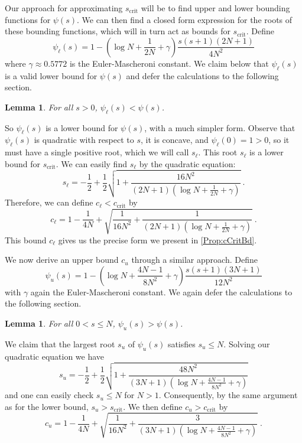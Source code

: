 \documentclass[11pt]{article}
\numberwithin{equation}{section}
\newtheorem{lemma}[thm]{Lemma}
\theoremstyle{definition}
\theoremstyle{definition}
\theoremstyle{definition}
\newcommand{\1}{\mathbf{1}}
\newcommand{\cCrit}{c_\mathrm{crit}}
\newcommand{\psiL}{\psi_{\ell}}
\newcommand{\psiU}{\psi_{u}}
\newcommand{\harmonicUpperBd}{\log N + \frac{1}{2N} + \gamma}
\newcommand{\harmonicLowerBd}{\log N + \frac{4N-1}{8N^2} + \gamma}
\newcommand{\subVar}{s}
\newcommand{\subVarCrit}{\subVar_{\text{crit}}}
\begin{document}
Our approach for approximating $\subVarCrit$ will be to find upper and lower bounding functions for $\psi(\subVar)$. We can then find a closed form expression for the roots of these bounding functions, which will in turn act as bounds for $\subVarCrit$.
Define
\begin{equation}\label{Eqn:psiLowerBd}
    \psiL(\subVar) = 1- \left(\harmonicUpperBd \right)\frac{\subVar(\subVar+1)(2N+1)}{4N^2}
\end{equation}
where $\gamma \approx 0.5772$ is the Euler-Mascheroni constant. We claim below that $\psiL(\subVar)$ is a valid lower bound for $\psi(\subVar)$ and defer the calculations to the following section.

\begin{lemma}\label{Lem:psiL}
    For all $\subVar>0$, $\psiL(\subVar) < \psi(\subVar)$.
\end{lemma}

So $\psiL(\subVar)$ is a lower bound for $\psi(\subVar)$, with a much simpler form. Observe that $\psiL(\subVar)$ is quadratic with respect to $\subVar$, it is concave, and $\psiL(0)=1>0$, so it must have a single positive root, which we will call $\subVar_\ell$. This root $\subVar_\ell$ is a lower bound for $\subVarCrit$.
We can easily find $\subVar_\ell$ by the quadratic equation:
\begin{equation*}
    \subVar_\ell = -\frac{1}{2} + \frac{1}{2}\sqrt{1+\frac{16N^2}{(2N+1)(\harmonicUpperBd)}} \ .
\end{equation*}
Therefore, we can define $c_\ell < \cCrit$ by
\begin{equation*}
    c_\ell = 1 -\frac{1}{4N} + \sqrt{\frac{1}{16N^2}+\frac{1}{(2N+1)(\harmonicUpperBd)}} \ .
\end{equation*}
This bound $c_\ell$ gives us the precise form we present in \cref{Prop:cCritBd}.

We now derive an upper bound $c_u$ through a similar approach. Define
\begin{equation}\label{Eqn:psiUpperBd}
    \psiU(\subVar) = 1-\left(\harmonicLowerBd \right) \frac{\subVar(\subVar+1)(3N+1)}{12N^2}
\end{equation}
with $\gamma$ again the Euler-Mascheroni constant. We again defer the calculations to the following section.

\begin{lemma}\label{Lem:psiU}
    For all $0<\subVar\leq N$, $\psiU(\subVar) > \psi(\subVar)$.
\end{lemma}

We claim that the largest root $\subVar_u$ of $\psi_u(\subVar)$ satisfies $\subVar_u \leq N$. Solving our quadratic equation we have
\begin{equation*}
    \subVar_u = -\frac{1}{2} + \frac{1}{2}\sqrt{1+\frac{48N^2}{(3N+1)(\harmonicLowerBd)}}
\end{equation*}
and one can easily check $\subVar_u \leq N$ for $N > 1$. Consequently, by the same argument as for the lower bound, $\subVar_u > \subVar_\mathrm{crit}$. We then define $c_u > \cCrit$ by
\begin{equation*}
    c_u = 1 -\frac{1}{4N} + \sqrt{\frac{1}{16N^2}+\frac{3}{(3N+1)(\harmonicLowerBd)}} \ . 
\end{equation*}
\end{document}
